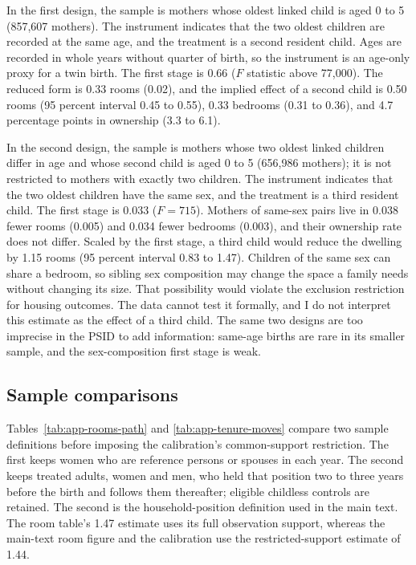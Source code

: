 In the first design, the sample is mothers whose oldest linked child is aged 0
to 5 (857,607 mothers). The instrument indicates that the two oldest children
are recorded at the same age, and the treatment is a second resident child.
Ages are recorded in whole years without quarter of birth, so the instrument
is an age-only proxy for a twin birth. The first stage is 0.66 ($F$ statistic
above 77,000). The reduced form is 0.33 rooms (0.02), and the implied effect of
a second child is 0.50 rooms (95 percent interval 0.45 to 0.55), 0.33 bedrooms
(0.31 to 0.36), and 4.7 percentage points in ownership (3.3 to 6.1).

In the second design, the sample is mothers whose two oldest linked children
differ in age and whose second child is aged 0 to 5 (656,986 mothers); it is
not restricted to mothers with exactly two children. The instrument indicates
that the two oldest children have the same sex, and the treatment is a third
resident child. The first stage is 0.033 ($F=715$). Mothers of same-sex pairs
live in 0.038 fewer rooms (0.005) and 0.034 fewer bedrooms (0.003), and their
ownership rate does not differ. Scaled by the first stage, a third child would
reduce the dwelling by 1.15 rooms (95 percent interval 0.83 to 1.47). Children of the same sex can
share a bedroom, so sibling sex composition may change the space a family
needs without changing its size. That possibility would violate the exclusion
restriction for housing outcomes. The data cannot test it formally, and I do
not interpret this estimate as the effect of a third child. The same two designs are too imprecise in the PSID to add
information: same-age births are rare in its smaller sample, and the
sex-composition first stage is weak.

\subsection{Sample comparisons}
\label{app:empirical-two-samples}

Tables~\ref{tab:app-rooms-path} and \ref{tab:app-tenure-moves} compare two
sample definitions before imposing the calibration's common-support
restriction. The first keeps women who are reference persons or spouses in
each year. The second keeps treated adults, women and men, who held that position
two to three years before the birth and follows them thereafter; eligible
childless controls are retained. The second
is the household-position definition used in the main text. The room table's
1.47 estimate uses its full observation support, whereas the main-text room
figure and the calibration use the restricted-support estimate of 1.44.

